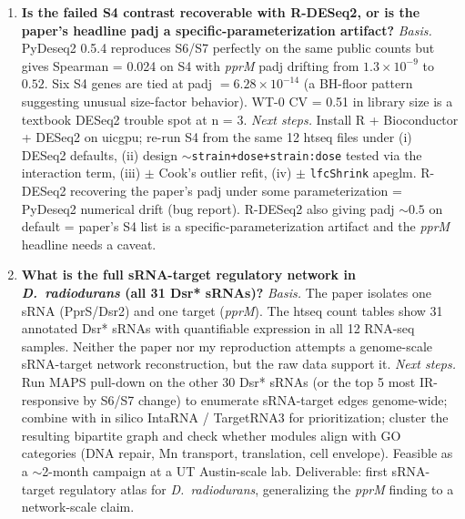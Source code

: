 \begin{enumerate}
\item \textbf{Is the failed S4 contrast recoverable with R-DESeq2, or is the paper's headline padj a specific-parameterization artifact?}
\emph{Basis.} PyDeseq2 0.5.4 reproduces S6/S7 perfectly on the same public counts but gives Spearman = 0.024 on S4 with \emph{pprM} padj drifting from $1.3\times10^{-9}$ to $0.52$. Six S4 genes are tied at padj $= 6.28\times10^{-14}$ (a BH-floor pattern suggesting unusual size-factor behavior). WT-0 CV = 0.51 in library size is a textbook DESeq2 trouble spot at n = 3.
\emph{Next steps.} Install R + Bioconductor + DESeq2 on uicgpu; re-run S4 from the same 12 htseq files under (i) DESeq2 defaults, (ii) design \texttt{$\sim$strain+dose+strain:dose} tested via the interaction term, (iii) $\pm$ Cook's outlier refit, (iv) $\pm$ \texttt{lfcShrink} apeglm. R-DESeq2 recovering the paper's padj under some parameterization = PyDeseq2 numerical drift (bug report). R-DESeq2 also giving padj $\sim 0.5$ on default = paper's S4 list is a specific-parameterization artifact and the \emph{pprM} headline needs a caveat.

\item \textbf{What is the full sRNA-target regulatory network in \emph{D.\ radiodurans} (all 31 Dsr* sRNAs)?}
\emph{Basis.} The paper isolates one sRNA (PprS/Dsr2) and one target (\emph{pprM}). The htseq count tables show 31 annotated Dsr* sRNAs with quantifiable expression in all 12 RNA-seq samples. Neither the paper nor my reproduction attempts a genome-scale sRNA-target network reconstruction, but the raw data support it.
\emph{Next steps.} Run MAPS pull-down on the other 30 Dsr* sRNAs (or the top 5 most IR-responsive by S6/S7 change) to enumerate sRNA-target edges genome-wide; combine with in silico IntaRNA / TargetRNA3 for prioritization; cluster the resulting bipartite graph and check whether modules align with GO categories (DNA repair, Mn transport, translation, cell envelope). Feasible as a $\sim$2-month campaign at a UT Austin-scale lab. Deliverable: first sRNA-target regulatory atlas for \emph{D.\ radiodurans}, generalizing the \emph{pprM} finding to a network-scale claim.

\end{enumerate}
